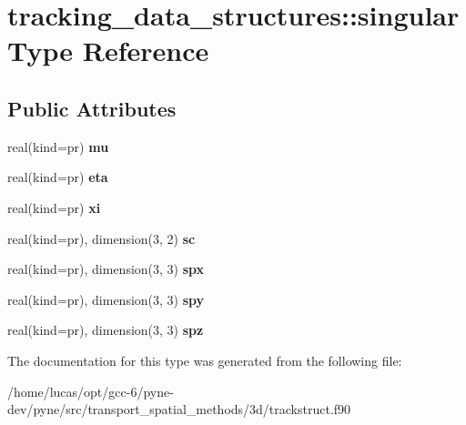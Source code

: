 \hypertarget{structtracking__data__structures_1_1singular}{}\section{tracking\+\_\+data\+\_\+structures\+:\+:singular Type Reference}
\label{structtracking__data__structures_1_1singular}
\subsection*{Public Attributes}
\begin{DoxyCompactItemize}
\item 
real(kind=pr) {\bfseries mu}\hypertarget{structtracking__data__structures_1_1singular_acd79fe7d9374778a1a073f01d33bc323}{}\label{structtracking__data__structures_1_1singular_acd79fe7d9374778a1a073f01d33bc323}

\item 
real(kind=pr) {\bfseries eta}\hypertarget{structtracking__data__structures_1_1singular_a8015e49ee70edd759eb801446b40de59}{}\label{structtracking__data__structures_1_1singular_a8015e49ee70edd759eb801446b40de59}

\item 
real(kind=pr) {\bfseries xi}\hypertarget{structtracking__data__structures_1_1singular_ac42e62b9f85705c6e68a6d07bc6c889c}{}\label{structtracking__data__structures_1_1singular_ac42e62b9f85705c6e68a6d07bc6c889c}

\item 
real(kind=pr), dimension(3, 2) {\bfseries sc}\hypertarget{structtracking__data__structures_1_1singular_ae99e040b2944a8f103cb730cef072f7b}{}\label{structtracking__data__structures_1_1singular_ae99e040b2944a8f103cb730cef072f7b}

\item 
real(kind=pr), dimension(3, 3) {\bfseries spx}\hypertarget{structtracking__data__structures_1_1singular_aeb81711c1d7153fe3dc8eae682f08134}{}\label{structtracking__data__structures_1_1singular_aeb81711c1d7153fe3dc8eae682f08134}

\item 
real(kind=pr), dimension(3, 3) {\bfseries spy}\hypertarget{structtracking__data__structures_1_1singular_ab7f1cf71b301b3dd7b30004bb3fecbea}{}\label{structtracking__data__structures_1_1singular_ab7f1cf71b301b3dd7b30004bb3fecbea}

\item 
real(kind=pr), dimension(3, 3) {\bfseries spz}\hypertarget{structtracking__data__structures_1_1singular_a5bfe4d508ca8ba24ddd3c14c20c03086}{}\label{structtracking__data__structures_1_1singular_a5bfe4d508ca8ba24ddd3c14c20c03086}

\end{DoxyCompactItemize}


The documentation for this type was generated from the following file\+:\begin{DoxyCompactItemize}
\item 
/home/lucas/opt/gcc-\/6/pyne-\/dev/pyne/src/transport\+\_\+spatial\+\_\+methods/3d/trackstruct.\+f90\end{DoxyCompactItemize}
